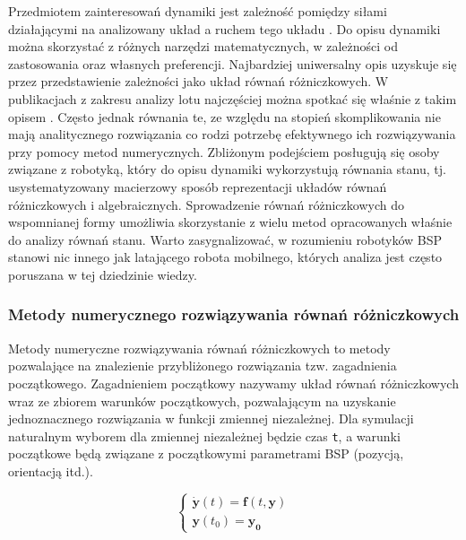 Przedmiotem zainteresowań dynamiki jest zależność pomiędzy siłami działającymi na analizowany układ a ruchem tego układu \cite{mw}.  Do opisu dynamiki można skorzystać z różnych narzędzi matematycznych, w zależności od zastosowania oraz własnych preferencji. Najbardziej uniwersalny opis uzyskuje się przez przedstawienie zależności jako układ równań różniczkowych. W publikacjach z zakresu analizy lotu najczęściej można spotkać się właśnie z takim opisem \cite{energies}\cite{quaterion}. Często jednak równania te, ze względu na stopień skomplikowania nie mają analitycznego rozwiązania co rodzi potrzebę efektywnego ich rozwiązywania przy pomocy metod numerycznych. Zbliżonym podejściem posługują się osoby związane z robotyką, który do opisu dynamiki wykorzystują równania stanu, tj. usystematyzowany macierzowy sposób reprezentacji układów równań różniczkowych i algebraicznych. Sprowadzenie równań różniczkowych do wspomnianej formy umożliwia skorzystanie z wielu metod opracowanych właśnie do analizy równań stanu. Warto zasygnalizować, w rozumieniu robotyków BSP stanowi nic innego jak latającego robota mobilnego, których analiza jest często poruszana w tej dziedzinie wiedzy.

\subsubsection{Metody numerycznego rozwiązywania równań różniczkowych}

Metody numeryczne rozwiązywania równań różniczkowych to metody pozwalające na znalezienie przybliżonego rozwiązania tzw. zagadnienia początkowego. Zagadnieniem początkowy nazywamy układ równań różniczkowych wraz ze zbiorem warunków początkowych, pozwalającym na uzyskanie jednoznacznego rozwiązania w funkcji zmiennej niezależnej. Dla symulacji naturalnym wyborem dla zmiennej niezależnej będzie czas \texttt{t}, a warunki początkowe będą związane z początkowymi parametrami BSP (pozycją, orientacją itd.).

\[
	\begin{cases}
		\dot{\bm{y}} \left( t \right)  = \bm{f} \left( t,\bm{y}\right) \\
		\bm{y} \left( t_0 \right) = \bm{y_0}
	\end{cases}
\]


